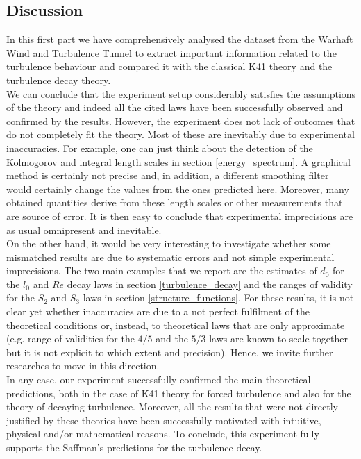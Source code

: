 \documentclass[11pt,titlepage]{article}
\begin{document}
\subsection{Discussion} %
In this first part we have comprehensively analysed the dataset from the Warhaft Wind and Turbulence Tunnel to extract important information related to the turbulence behaviour and compared it with the classical K41 theory and the turbulence decay theory. \\
We can conclude that the experiment setup considerably satisfies the assumptions of the theory and indeed all the cited laws have been successfully observed and confirmed by the results. However, the experiment does not lack of outcomes that do not completely fit the theory. Most of these are inevitably due to experimental inaccuracies. For example, one can just think about the detection of the Kolmogorov and integral length scales in section \ref{energy_spectrum}. A graphical method is certainly not precise and, in addition, a different smoothing filter would certainly change the values from the ones predicted here. Moreover, many obtained quantities derive from these length scales or other measurements that are source of error. It is then easy to conclude that experimental imprecisions are as usual omnipresent and inevitable. \\
On the other hand, it would be very interesting to investigate whether some mismatched results are due to systematic errors and not simple experimental imprecisions. The two main examples that we report are the estimates of $d_0$ for the $l_0$ and $Re$ decay laws in section \ref{turbulence_decay} and the ranges of validity for the $S_2$ and $S_3$ laws in section \ref{structure_functions}.  For these results, it is not clear yet whether inaccuracies are due to a not perfect fulfilment of the theoretical conditions or, instead, to theoretical laws that are only approximate (e.g. range of validities for the $4/5$ and the $5/3$ laws are known to scale together but it is not explicit to which extent and precision). Hence, we invite further researches to move in this direction. \\
In any case, our experiment successfully confirmed the main theoretical predictions, both in the case of K41 theory for forced turbulence and also for the theory of decaying turbulence. Moreover, all the results that were not directly justified by these theories have been successfully motivated with intuitive, physical and/or mathematical reasons. To conclude, this experiment fully supports the Saffman's predictions for the turbulence decay.
\end{document}
